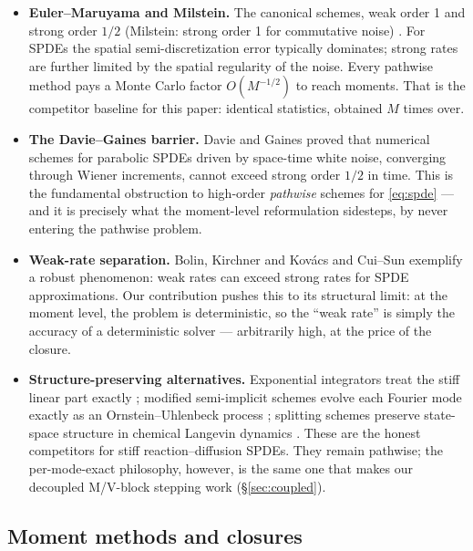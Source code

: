 \begin{itemize}
\item \textbf{Euler--Maruyama and Milstein.} The canonical schemes, weak order 1
and strong order $1/2$ (Milstein: strong order 1 for commutative noise)
\citep{kloeden1992,leonhard2014,hajiali2023}. For SPDEs the spatial
semi-discretization error typically dominates; strong rates are further limited
by the spatial regularity of the noise. Every pathwise method pays a Monte Carlo
factor $O(M^{-1/2})$ to reach moments. That is the competitor baseline for this
paper: identical statistics, obtained $M$ times over.

\item \textbf{The Davie--Gaines barrier.} Davie and Gaines \citep{davie2001}
proved that numerical schemes for parabolic SPDEs driven by space-time white
noise, converging through Wiener increments, cannot exceed strong order $1/2$ in
time. This is the fundamental obstruction to high-order \emph{pathwise} schemes
for \eqref{eq:spde} --- and it is precisely what the moment-level reformulation
sidesteps, by never entering the pathwise problem.

\item \textbf{Weak-rate separation.} Bolin, Kirchner and Kov\'acs
\citep{bolin2018} and Cui--Sun \citep{cui2023} exemplify a robust phenomenon:
weak rates can exceed strong rates for SPDE approximations. Our contribution
pushes this to its structural limit: at the moment level, the problem is
deterministic, so the ``weak rate'' is simply the accuracy of a deterministic
solver --- arbitrarily high, at the price of the closure.

\item \textbf{Structure-preserving alternatives.} Exponential integrators treat
the stiff linear part exactly \citep{lord2010}; modified semi-implicit schemes
evolve each Fourier mode exactly as an Ornstein--Uhlenbeck process
\citep{tambue2016}; splitting schemes preserve state-space structure in chemical
Langevin dynamics \citep{jovanovski2025,ulander2024}. These are the honest
competitors for stiff reaction--diffusion SPDEs. They remain pathwise; the
per-mode-exact philosophy, however, is the same one that makes our decoupled
M/V-block stepping work (\S\ref{sec:coupled}).
\end{itemize}

\subsection{Moment methods and closures}

